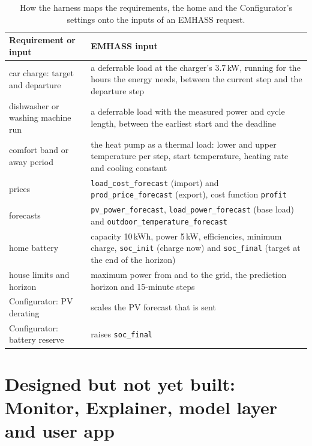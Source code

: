 \begin{table}[htbp]
\caption{How the harness maps the requirements, the home and the
Configurator's settings onto the inputs of an EMHASS request.}
\label{tab:emhassmap}
\small
\begin{tabularx}{\textwidth}{@{}>{\raggedright\arraybackslash}p{4.6cm}X@{}}
\toprule
Requirement or input & EMHASS input \\
\midrule
car charge: target and departure & a deferrable load at the charger's 3.7\,kW, running for the hours the energy needs, between the current step and the departure step \\
dishwasher or washing machine run & a deferrable load with the measured power and cycle length, between the earliest start and the deadline \\
comfort band or away period & the heat pump as a thermal load: lower and upper temperature per step, start temperature, heating rate and cooling constant \\
prices & \texttt{load\_cost\_forecast} (import) and \texttt{prod\_price\_forecast} (export), cost function \texttt{profit} \\
forecasts & \texttt{pv\_power\_forecast}, \texttt{load\_power\_forecast} (base load) and \texttt{outdoor\_temperature\_forecast} \\
home battery & capacity 10\,kWh, power 5\,kW, efficiencies, minimum charge, \texttt{soc\_init} (charge now) and \texttt{soc\_final} (target at the end of the horizon) \\
house limits and horizon & maximum power from and to the grid, the prediction horizon and 15-minute steps \\
Configurator: PV derating & scales the PV forecast that is sent \\
Configurator: battery reserve & raises \texttt{soc\_final} \\
\bottomrule
\end{tabularx}
\end{table}

\section{Designed but not yet built: Monitor, Explainer, model layer and user app}
\label{sec:envisioned}
\label{sec:userapp}

